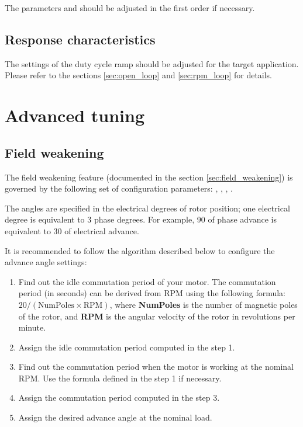 \documentclass{zubaxdoc}
\begin{document}
The parameters  and  should be adjusted in the first
order if necessary.

\subsection{Response characteristics}

The settings of the duty cycle ramp should be adjusted for the target application.
Please refer to the sections \ref{sec:open_loop} and \ref{sec:rpm_loop} for details.

\section{Advanced tuning}

\subsection{Field weakening}

The field weakening feature (documented in the section \ref{sec:field_weakening}) is governed by the following
set of configuration parameters:
, , , .

The angles are specified in the electrical degrees of rotor position;
one electrical degree is equivalent to 3 phase degrees.
For example, 90\textdegree{} of phase advance is equivalent to 30\textdegree{} of electrical advance.

It is recommended to follow the algorithm described below to configure the advance angle settings:

\begin{enumerate}
    \item Find out the idle commutation period of your motor.
          The commutation period (in seconds) can be derived from RPM using the following formula:
          $20 / (\text{NumPoles}\times\text{RPM})$, where \textbf{NumPoles} is the number of magnetic poles
          of the rotor, and \textbf{RPM} is the angular velocity of the rotor in revolutions per minute.

    \item Assign  the idle commutation period computed in the step 1.

    \item Find out the commutation period when the motor is working at the nominal RPM.
          Use the formula defined in the step 1 if necessary.

    \item Assign  the commutation period computed in the step 3.

    \item Assign  the desired advance angle at the nominal load.
\end{enumerate}
\end{document}
